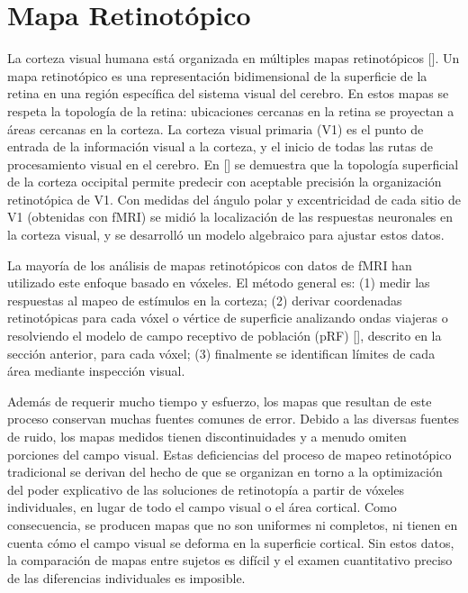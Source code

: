 \section{Mapa Retinotópico}

La corteza visual humana está organizada en múltiples mapas retinotópicos [\cite{wandell_computational_2015}]. Un mapa retinotópico es una representación bidimensional de la superficie de la retina en una región específica del sistema visual del cerebro. En estos mapas se respeta la topología de la retina: ubicaciones cercanas en la retina se proyectan a áreas cercanas en la corteza. La corteza visual primaria (V1) es el punto de entrada de la información visual a la corteza, y el inicio de todas las rutas de procesamiento visual en el cerebro. En [\cite{benson_retinotopic_2012}] se demuestra que la topología superficial de la corteza occipital permite predecir con aceptable precisión la organización retinotópica de V1. Con medidas del ángulo polar y excentricidad de cada sitio de V1 (obtenidas con fMRI) se midió la localización de las respuestas neuronales en la corteza visual, y se desarrolló un modelo algebraico para ajustar estos datos. 

La mayoría de los análisis de mapas retinotópicos con datos de fMRI han utilizado este enfoque basado en vóxeles. El método general es: (1) medir las respuestas al mapeo de estímulos en la corteza; (2) derivar coordenadas retinotópicas para cada vóxel o vértice de superficie analizando ondas viajeras o resolviendo el modelo de campo receptivo de población (pRF) [\cite{dumoulin_population_2008}], descrito en la sección anterior, para cada vóxel; (3) finalmente se identifican límites de cada área mediante inspección visual.

Además de requerir mucho tiempo y esfuerzo, los mapas que resultan de este proceso conservan muchas fuentes comunes de error. Debido a las diversas fuentes de ruido, los mapas medidos tienen discontinuidades y a menudo omiten porciones del campo visual. Estas deficiencias del proceso de mapeo retinotópico tradicional se derivan del hecho de que se organizan en torno a la optimización del poder explicativo de las soluciones de retinotopía a partir de vóxeles individuales, en lugar de todo el campo visual o el área cortical. Como consecuencia, se producen mapas que no son uniformes ni completos, ni tienen en cuenta cómo el campo visual se deforma en la superficie cortical. Sin estos datos, la comparación de mapas entre sujetos es difícil y el examen cuantitativo preciso de las diferencias individuales es imposible.

